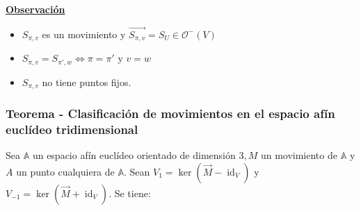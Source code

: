 \documentclass[12pt, a4paper, ones, notitlepage, openany,titlepage]{article}
\newcommand{\observacion}{\noindent\underline{\textbf{Observación}}}
\begin{document}
\observacion

\begin{itemize}
	\item $S_{\pi, v}$ es un movimiento y $\overrightarrow{S_{\pi,v}} = S_U \in \mathcal{O}^-(V)$
	\item $S_{\pi,v} = S_{\pi',w} \Longleftrightarrow \pi = \pi'$ y $v = w$
	\item $S_{\pi,v}$ no tiene puntos fijos.
\end{itemize}

\subsubsection{Teorema - Clasificación de movimientos en el espacio afín euclídeo tridimensional}
Sea $\mathbb{A}$ un espacio afín euclídeo orientado de dimensión $3, M$ un movimiento de $\mathbb{A}$ y $A$ un punto cualquiera de $\mathbb{A}$. Sean $V_{1}=\ker\left(\overrightarrow{M}-\operatorname{id}_{V}\right)$ y $V_{-1}=\ker\left(\overrightarrow{M}+\operatorname{id}_{V}\right)$. Se tiene:
\end{document}
